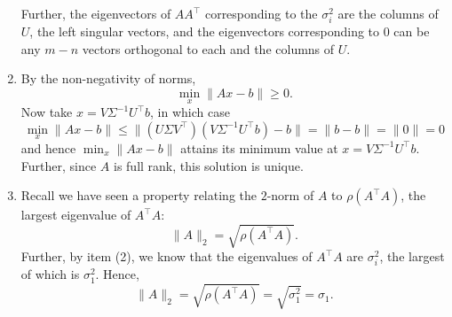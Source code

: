 \documentclass{../../../kin_math}
\begin{document}
\begin{questions}
\begin{solution}
\begin{enumerate}[label=(\arabic*)]
      Further, the eigenvectors of $AA^\top$ corresponding to the $\sigma_i^2$ are the columns of $U$, the left singular vectors, and the eigenvectors corresponding to 0 can be any $m - n$ vectors orthogonal to each and the columns of $U$.
      \item By the non-negativity of norms,
      \begin{equation*}
        \min_x \lVert Ax - b \rVert \geq 0.
      \end{equation*}
      Now take $x = V \Sigma^{-1} U^\top b$, in which case
      \begin{equation*}
        \min_x \lVert Ax - b \rVert \leq \lVert (U \Sigma V^\top)(V \Sigma^{-1} U^\top b) - b \rVert = \lVert b - b \rVert = \lVert 0 \rVert = 0
      \end{equation*}
      and hence $\min_x \lVert Ax - b \rVert$ attains its minimum value at $x = V \Sigma^{-1} U^\top b$. Further, since $A$ is full rank, this solution is unique.
      \item Recall we have seen a property relating the $2$-norm of $A$ to $\rho(A^\top A)$, the largest eigenvalue of $A^\top A$:
      \begin{equation*}
        \lVert A \rVert_2 = \sqrt{\rho(A^\top A)}.
      \end{equation*}
      Further, by item (2), we know that the eigenvalues of $A^\top A$ are $\sigma_i^2$, the largest of which is $\sigma_1^2$. Hence,
      \begin{equation*}
        \lVert A \rVert_2 = \sqrt{\rho(A^\top A)} = \sqrt{\sigma_1^2} = \sigma_1.
      \end{equation*}


\end{enumerate}
\end{solution}
\end{questions}
\end{document}

